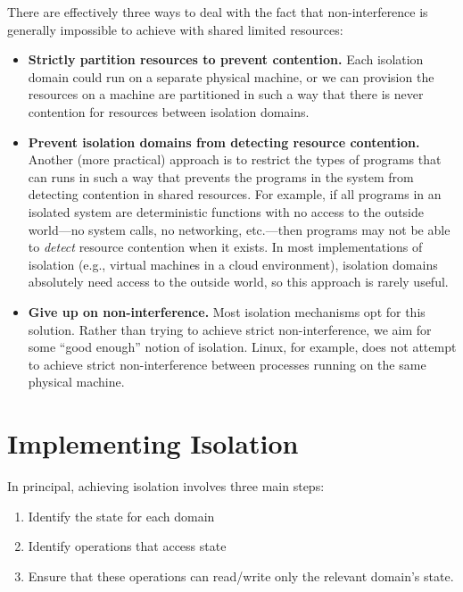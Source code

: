 There are effectively three ways to deal with the fact
that non-interference is generally impossible to 
achieve with shared limited resources:
\begin{itemize}
\item \textbf{Strictly partition resources to prevent contention.}
      Each isolation domain could run on a separate physical machine,
      or we can provision the resources on a machine are partitioned
      in such a way that there is never contention for resources
      between isolation domains.

\item \textbf{Prevent isolation domains from detecting resource contention.}
      Another (more practical) approach is to restrict the types
      of programs that can runs in such a way that prevents
      the programs in the system from detecting contention in 
      shared resources.
      For example, if all programs in an isolated system are deterministic
      functions with no access to the outside world---no system calls,
      no networking, etc.---then programs may not be able to \emph{detect}
      resource contention when it exists.
      In most implementations of isolation (e.g., virtual machines in
      a cloud environment), isolation domains absolutely need access to the
      outside world, so this approach is rarely useful.

\item \textbf{Give up on non-interference.}
      Most isolation mechanisms opt for this solution.
      Rather than trying to achieve strict non-interference,
      we aim for some ``good enough'' notion of isolation.
      Linux, for example, does not attempt to achieve
      strict non-interference between processes running
      on the same physical machine.

\end{itemize}

\section{Implementing Isolation}
In principal, achieving isolation involves three main steps:
\begin{enumerate}
	\item Identify the state for each domain
	\item Identify operations that access state
	\item Ensure that these operations can read/write only the relevant domain's state.
\end{enumerate}

